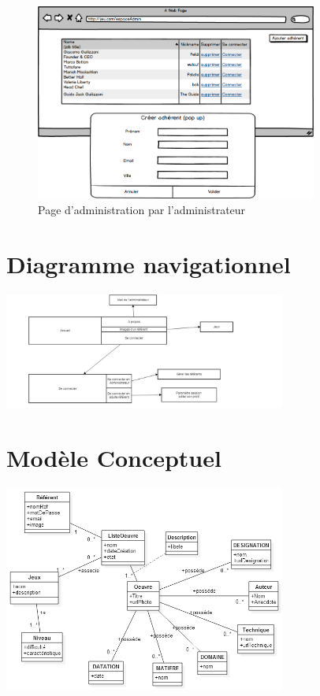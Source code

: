 \documentclass[12pt,a4paper]{report}
\begin{document}
\begin{figure}
	\includegraphics[width=350px]{../Maquette/espaceAdmin.png}
	\caption{Page d'administration par l'administrateur}
\end{figure}


\chapter{ Diagramme navigationnel}
\includegraphics[width=350px]{../../UML/diagramme_navigationnel.jpg}\\

\chapter{Modèle Conceptuel}
\includegraphics[width=350px]{../../UML/diagrammeClasse.png}\\
\end{document}
